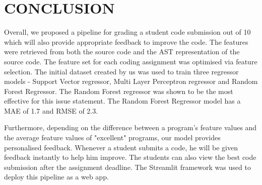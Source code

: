 \chapter{CONCLUSION}

Overall, we proposed a pipeline for grading a student code submission out of 10 which will also provide appropriate feedback to improve the code. The features were retrieved from both the source code and the AST representation of the source code. The feature set for each coding assignment was optimised via feature selection. The initial dataset created by us was used to train three regressor models - Support Vector regressor, Multi Layer Perceptron regressor and Random Forest Regressor. The Random Forest regressor was shown to be the most effective for this issue statement. The Random Forest Regressor model has a MAE of 1.7 and RMSE of 2.3.

Furthermore, depending on the difference between a program's feature values and the average feature values of "excellent" programs, our model provides personalised feedback.  Whenever a student submits a code, he will be given feedback instantly to help him improve. The students can also view the best code submission after the assignment deadline. The Streamlit framework was used to deploy this pipeline as a web app.